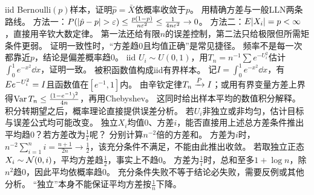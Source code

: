 {iid Bernoulli$(p)$样本，证明$\hat p=\bar X$依概率收敛于$p$。}
{用精确方差与一般LLN两条路线。}
{方法一：$\Pp(|\hat p-p|>\varepsilon)\le \frac{p(1-p)}{n\varepsilon^2}\le\frac{1}{4n\varepsilon^2}\to0$。
方法二：$E|X_i|=p<\infty$，直接用辛钦大数定律。
第一法还给有限$n$的误差控制，第二法只给极限但所需矩条件更弱。}
{证明一致性时，“方差趋0且均值正确”是常见捷径。}
{频率不是每一次都靠近$p$，结论是偏差概率趋0。}
{iid $U_i\sim U(0,1)$，用$T_n=n^{-1}\sum e^{-U_i^2}$估计$\int_0^1e^{-x^2}\dd x$，证明一致。}
{被积函数值构成iid有界样本。}
{记$I=\int_0^1e^{-x^2}\dd x$，有$E e^{-U_i^2}=I$且函数值在$[e^{-1},1]$内。
由辛钦定律$T_n\xrightarrow{P} I$；或用有界变量方差上界得$\operatorname{Var} T_n\le\frac{(1-e^{-1})^2}{4n}$，再用Chebyshev。
这同时给出样本平均的数值积分解释。}
{积分转期望之后，概率理论直接提供误差分析。}
{若$U_i$非独立或非均匀，估计目标与误差公式均可能改变。}
{独立$X_i$均值0、方差$i$，能否直接用上述总方差条件推出平均趋0？若方差改为$\frac{1}{i}$呢？}
{分别计算$n^{-2}$倍的方差和。}
{方差为$i$时，$n^{-2}\sum_{i=1}^ni=\frac{n+1}{2n}\to\frac{1}{2}$，该充分条件不满足，不能由此推出收敛。
若取独立正态$X_i\sim\mathcal N(0,i)$，平均方差趋$\frac{1}{2}$，事实上不趋0。
方差为$\frac{1}{i}$时，总和至多$1+\log n$，除$n^2$趋0，因此平均依概率趋0。}
{充分条件失败不等于结论必失败，需要反例或其他分析。}
{“独立”本身不能保证平均方差按$\frac{1}{n}$下降。}

